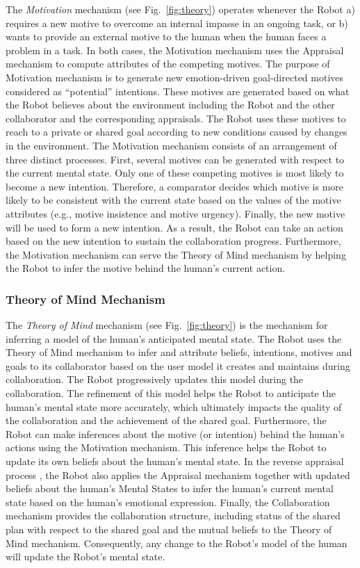 The \textit{Motivation} mechanism (see Fig.~\ref{fig:theory}) operates whenever
the Robot a) requires a new motive to overcome an internal impasse in an ongoing
task, or b) wants to provide an external motive to the human when the human
faces a problem in a task. In both cases, the Motivation mechanism uses the
Appraisal mechanism to compute attributes of the competing motives. The purpose
of Motivation mechanism is to generate new emotion-driven goal-directed motives
considered as ``potential'' intentions. These motives are generated based on what
the Robot believes about the environment including the Robot and the other
collaborator and the corresponding appraisals. The Robot uses these motives to
reach to a private or shared goal according to new conditions caused by changes
in the environment. The Motivation mechanism consists of an arrangement of three
distinct processes. First, several motives can be generated with respect to the
current mental state. Only one of these competing motives is most likely to
become a new intention. Therefore, a comparator decides which motive is more
likely to be consistent with the current state based on the values of the motive
attributes (e.g., motive insistence and motive urgency). Finally, the new motive
will be used to form a new intention. As a result, the Robot can take an action
based on the new intention to sustain the collaboration progress. Furthermore,
the Motivation mechanism can serve the Theory of Mind mechanism by helping the
Robot to infer the motive behind the human's current action.

\subsubsection{Theory of Mind Mechanism}
\label{sec:tom-mech}

The \textit{Theory of Mind} mechanism (see Fig.~\ref{fig:theory}) is the
mechanism for inferring a model of the human's anticipated mental state. The
Robot uses the Theory of Mind mechanism to infer and attribute beliefs,
intentions, motives and goals to its collaborator based on the user model it
creates and maintains during collaboration. The Robot progressively updates this
model during the collaboration. The refinement of this model helps the Robot to
anticipate the human's mental state more accurately, which ultimately impacts
the quality of the collaboration and the achievement of the shared goal.
Furthermore, the Robot can make inferences about the motive (or intention) behind
the human's actions using the Motivation mechanism. This inference helps the
Robot to update its own beliefs about the human's mental state. In the reverse
appraisal process \cite{gratch:reverse-appraisal}, the Robot also applies the
Appraisal mechanism together with updated beliefs about the human's Mental
States to infer the human's current mental state based on the human's emotional
expression. Finally, the Collaboration mechanism provides the collaboration
structure, including status of the shared plan with respect to the shared goal
and the mutual beliefs to the Theory of Mind mechanism. Consequently, any change
to the Robot's model of the human will update the Robot's mental state.


